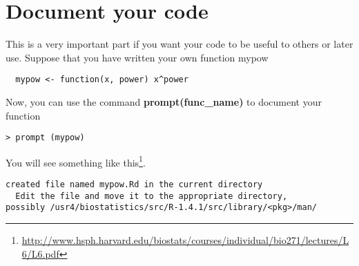 
\chapter{Document your code}
\label{chap:document-your-code-1}



This is a very important part if you want your code to be useful to
others or later use.  Suppose that you have written your own function
mypow
\begin{lstlisting}
  mypow <- function(x, power) x^power
\end{lstlisting}

Now, you can use the command {\bf prompt(func\_name)} to document your function

\begin{lstlisting}
> prompt (mypow)
\end{lstlisting}
You will see something like this\footnote{\url{http://www.hsph.harvard.edu/biostats/courses/individual/bio271/lectures/L6/L6.pdf}}.
\begin{verbatim}
created file named mypow.Rd in the current directory
  Edit the file and move it to the appropriate directory, 
possibly /usr4/biostatistics/src/R-1.4.1/src/library/<pkg>/man/
\end{verbatim}


